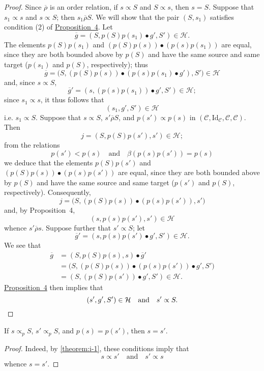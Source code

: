 \documentclass[a4paper,fleqn]{article}
\theoremstyle{plain}
\newenvironment{corollary}[1]
  {\renewcommand\theinnercorollary{#1}\innercorollary}
  {\endinnercorollary}
\theoremstyle{definition}
\newcommand{\oldpage}[1]{{\marginpar{\footnotesize$\bigg\vert$\,\,\,\,\textit{p.~#1}}}}
\newcommand{\textand}{\quad\text{and}\quad}
\newcommand{\CC}{\mathcal{C}}
\newcommand{\HH}{\mathcal{H}}
\newcommand{\relrhobar}{\mathrel{\overline{\rho}}}
\newcommand{\subs}{\mathrel{\propto}}
\newcommand{\Id}{\mathrm{Id}}
\begin{document}
\begin{proof}
  Since $\relrhobar$ is an order relation, if $s\subs S$ and $S\subs s$, then $s=S$.
  Suppose that $s_1\subs s$ and $s\subs S$;
  then $s_1\relrhobar S$.
  We will show that the pair $(S,s_1)$ satisfies condition (2\textquotesingle) of \hyperref[proposition:i-4]{Proposition~4}.
  Let
  \[
    \overline{g}
    = (S,p(S)p(s_1)\bullet g',S')
    \in\HH.
  \]
  The elements $p(S)p(s_1)$ and $(p(S)p(s))\bullet(p(s)p(s_1))$ are equal, since they are both bounded above by $p(S)$ and have the same source and same target ($p(s_1)$ and $p(S)$, respectively);
  thus
  \[
    \overline{g}
    = \big(S,(p(S)p(s))\bullet(p(s)p(s_1)\bullet g'),S'\big)
    \in\HH
  \]
  and, since $s\subs S$,
  \[
    \overline{g}'
    = (s,(p(s)p(s_1))\bullet g', S')
    \in\HH;
  \]
  since $s_1\subs s$, it thus follows that
  \[
    (s_1,g',S')
    \in\HH
  \]
  i.e. $s_1\subs S$.
  Suppose that $s\subs S$, $s'\relrhobar S$, and $p(s')\subs p(s)$ in $(\CC,\Id_\CC,\CC,\CC)$.
  Then
  \[
    j
    = (S,p(S)p(s'),s')
    \in\HH;
  \]
  from the relations
  \[
    p(s') < p(s)
    \textand
    \beta(p(s)p(s')) = p(s)
  \]
  we deduce that the elements $p(S)p(s')$ and $(p(S)p(s))\bullet(p(s)p(s'))$ are equal, since they are both bounded above by $p(S)$ and have the same source and same target ($p(s')$ and $p(S)$, respectively).
  Consequently,
  \[
    j
    = \big(S,(p(S)p(s))\bullet(p(s)p(s')),s'\big)
  \]
  and, by Proposition~4,
  \[
    (s,p(s)p(s'),s')
    \in\HH
  \]
  whence $s'\relrhobar s$.
  Suppose further that $s'\subs S$;
  let
  \[
    \overline{g}'
    = (s,p(s)p(s')\bullet g',S')
    \in\HH.
  \]
  We see that
  \[
    \begin{aligned}
      \overline{g}
      &= (S,p(S)p(s),s)\bullet\overline{g}'
    \\&= \big(S,(p(S)p(s))\bullet(p(s)p(s'))\bullet g',S'\big)
    \\&= (S,(p(S)p(s'))\bullet g',S')
    \in\HH.
    \end{aligned}
  \]
  \oldpage{363}
  \hyperref[proposition:i-4]{Proposition~4} then implies that
  \[
    (s',g',S')\in\HH
    \textand
    s'\subs S.
    \qedhere
  \]
\end{proof}

\begin{corollary}{1}
  If $s\subs_p S$, $s'\subs_p S$, and $p(s)=p(s')$, then $s=s'$.
\end{corollary}

\begin{proof}
  Indeed, by \cref{theorem:i-1}, these conditions imply that
  \[
    s\subs s'
    \textand
    s'\subs s
  \]
  whence $s=s'$.
\end{proof}
\end{document}

